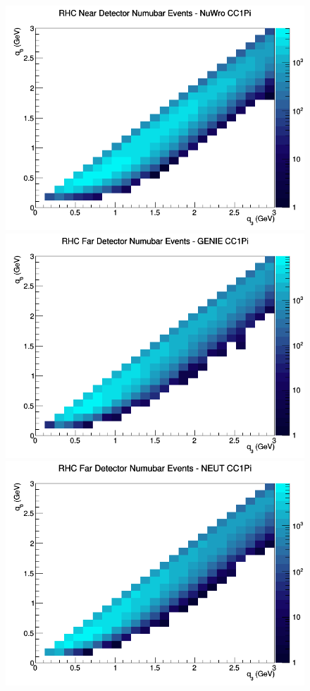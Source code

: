 \begin{figure}[h]
\includegraphics[width=\linewidth]{q0_q3/nominal/CC1Pi_RHC_ND_numubar_q3_q0_NuWro.png}
\endminipage
\newline
{}
\includegraphics[width=\linewidth]{q0_q3/nominal/CC1Pi_RHC_FD_numubar_q3_q0_GENIE.png}
\endminipage
{}
\includegraphics[width=\linewidth]{q0_q3/nominal/CC1Pi_RHC_FD_numubar_q3_q0_NEUT.png}

\end{figure}
